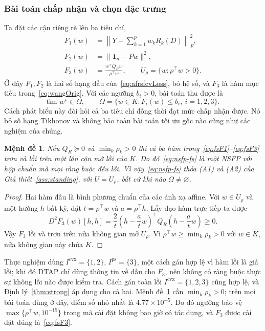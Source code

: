 \documentclass[]{interact}
\theoremstyle{plain}
\newtheorem{proposition}[theorem]{Mệnh đề}
\theoremstyle{definition}
\theoremstyle{remark}
\newcommand{\cvx}{\mathrm{cvx}}
\newcommand{\ps}{\mathrm{ps}}
\begin{document}
\subsubsection{Bài toán chấp nhận và chọn đặc trưng}\label{ssec:reduction}\label{ssec:selection}
Ta đặt các cận riêng rẽ lên ba tiêu chí,
\begin{align}
F_1(w)&=\left\|Y-\sum_{k=1}^{p}w_k\underline{R_k}(D)\right\|_F^2,\label{eq:fsF1}\\
F_2(w)&=\|\mathbf1_n-Pw\|^2,\label{eq:fsF2}\\
F_3(w)&=\frac{w^{\top}Q_Rw}{\rho^{\top}w},\qquad U_\rho=\{w:\rho^{\top}w>0\}.\label{eq:fsF3}
\end{align}
Ở đây $F_1,F_2$ là hai số hạng đầu của~\eqref{eq:afrsfcvLoss}, bỏ hệ số, và $F_3$ là hàm mục tiêu trong~\eqref{eq:wangOrig}. Với các ngưỡng $b_i>0$, bài toán thu được là
\begin{equation}\label{eq:nsfp-fs}
\text{tìm }w^\star\in\Omega,\qquad \Omega=\{w\in K:F_i(w)\le b_i,\ i=1,2,3\}.
\end{equation}
Cách phát biểu này đòi hỏi cả ba tiêu chí đồng thời đạt mức chấp nhận được. Nó bỏ số hạng Tikhonov và không bảo toàn bài toán tối ưu gốc nào cũng như các nghiệm của chúng.

\begin{proposition}\label{prop:fs-reg}
Nếu $Q_R\succeq0$ và $\min_k\rho_k>0$ thì cả ba hàm trong~\eqref{eq:fsF1}--\eqref{eq:fsF3} trơn và lồi trên một lân cận mở lồi của $K$. Do đó~\eqref{eq:nsfp-fs} là một NSFP với hộp chuẩn mà mọi ràng buộc đều lồi. Vì vậy~\eqref{eq:nsfp-fs} thỏa (A1) và (A2) của Giả thiết~\ref{ass:standing}, với $U=U_\rho$, bất cứ khi nào $\Omega\ne\varnothing$.
\end{proposition}
\begin{proof}
Hai hàm đầu là bình phương chuẩn của các ánh xạ affine. Với $w\in U_\rho$ và một hướng $h$ bất kỳ, đặt $t=\rho^{\top}w$ và $a=\rho^{\top}h$. Lấy đạo hàm trực tiếp ta được
\begin{equation}\label{eq:fsF3-curvature}
D^2F_3(w)[h,h]=\frac2t\left(h-\frac atw\right)^{\!\top}Q_R\left(h-\frac atw\right)\ge0.
\end{equation}
Vậy $F_3$ lồi và trơn trên nửa không gian mở $U_\rho$. Vì $\rho^{\top}w\ge\min_k\rho_k>0$ với $w\in K$, nửa không gian này chứa $K$.
\end{proof}

Thực nghiệm dùng $I^{\cvx}=\{1,2\}$, $I^{\ps}=\{3\}$, một cách gán hợp lệ vì hàm lồi là giả lồi; khi đó DTAP chỉ dùng thông tin về dấu cho $F_3$, nên không có ràng buộc thực sự không lồi nào được kiểm tra. Cách gán toàn lồi $I^{\cvx}=\{1,2,3\}$ cũng hợp lệ, và Định lý~\ref{thm:strong} áp dụng cho cả hai. Mệnh đề~\ref{prop:fs-reg} cần $\min_k\rho_k>0$; trên mọi bài toán dùng ở đây, điểm số nhỏ nhất là $4.77\times10^{-5}$. Do đó ngưỡng bảo vệ $\max\{\rho^\top w,10^{-15}\}$ trong mã cài đặt không bao giờ có tác dụng, và $F_3$ được cài đặt đúng là~\eqref{eq:fsF3}.
\end{document}
